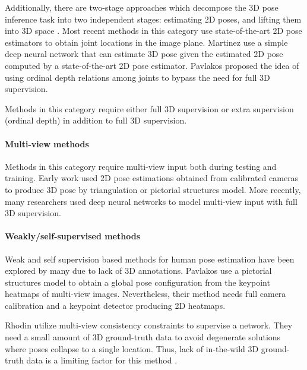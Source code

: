 \documentclass[10pt,twocolumn,letterpaper]{article}
\begin{document}
Additionally, there are two-stage approaches which decompose the 3D pose inference task into two independent stages: estimating 2D poses, and lifting them into 3D space \cite{2dposematching,Moreno_cvpr2017,martinez_2017_3dbaseline,posegrammar2018,zhou2016sparseness,2dposematching,Tome_2017_CVPR,monocular3d}. Most recent methods in this category use state-of-the-art 2D pose estimators \cite{cao2017,wei2016,newell2016,kocabas2018} to obtain joint locations in the image plane. Martinez \etal \cite{martinez_2017_3dbaseline} use a simple deep neural network that can estimate 3D pose given the estimated 2D pose computed by a state-of-the-art 2D pose estimator. Pavlakos \etal \cite{pavlakos2018ordinal} proposed the idea of using  ordinal depth relations among  joints to bypass the need for full 3D supervision. 

Methods in this category require either full 3D supervision or extra supervision (\eg ordinal depth) in addition to full 3D supervision. 
\paragraph{Multi-view methods} 
Methods in this category require multi-view input both during testing and training. Early work \cite{amin2013, martin2010,burenius2013, belagiannis2014, belagiannis2016} used 2D pose estimations obtained from calibrated cameras to produce 3D pose by triangulation or pictorial structures model. More recently, many researchers \cite{elhayek2017} used deep neural networks to model multi-view input with full 3D supervision. 
\paragraph{Weakly/self-supervised methods}
Weak and self supervision based methods for human pose estimation have been  explored by many  \cite{drover2018, rhodin2018, tung2017, pavlakos2017harvesting} due to lack of 3D annotations. Pavlakos \etal \cite{pavlakos2017harvesting} use a pictorial structures model to obtain a global pose configuration from the keypoint heatmaps of multi-view images. Nevertheless, their method needs full camera calibration and a keypoint detector producing 2D heatmaps.

Rhodin \etal \cite{rhodin2018} utilize multi-view consistency constraints to supervise a network. They need a small amount of 3D ground-truth data to avoid degenerate solutions where poses collapse to a single location. Thus, lack of in-the-wild 3D ground-truth data  is a limiting factor for this method \cite{rhodin2018}.
\end{document}
